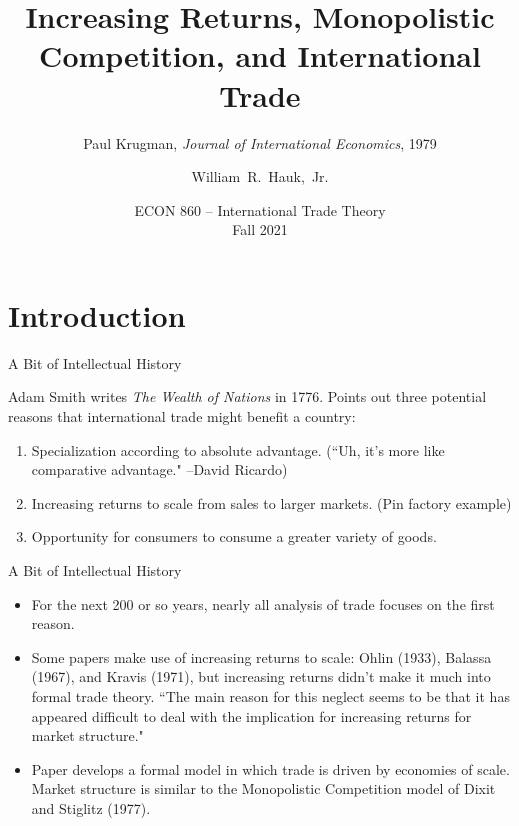 \documentclass[aspectratio=169]{beamer}
\title[Krugman (1979)] %
{Increasing Returns, Monopolistic Competition, and International Trade}
\subtitle{Paul Krugman, \emph{Journal of International Economics}, 1979}
\author [Hauk] %
{William~R.~Hauk,~Jr.} %
\institute[UofSC] %
{
  Darla Moore School of Business\\
  University of South Carolina
}
\date[ECON 860, Fall 2021] %
{ECON 860 -- International Trade Theory\\Fall 2021}
\begin{document}
\frame{\titlepage}


\section{Introduction}


\begin{frame}{A Bit of Intellectual History}

Adam Smith writes \emph{The Wealth of Nations} in 1776.  Points out three potential reasons that international trade might benefit a country:

\begin{enumerate}
    \item<1-> Specialization according to absolute advantage.  (``Uh, it’s more like comparative advantage." –David Ricardo)
    \item<2-> Increasing returns to scale from sales to larger markets.  (Pin factory example)
    \item<3-> Opportunity for consumers to consume a greater variety of goods.
\end{enumerate}
    
\end{frame}


\begin{frame}{A Bit of Intellectual History}

\begin{itemize}
    \item<1-> For the next 200 or so years, nearly all analysis of trade focuses on the first reason.
    \item<2-> Some papers make use of increasing returns to scale: Ohlin (1933), Balassa (1967), and Kravis (1971), but increasing returns didn’t make it much into formal trade theory.  ``The main reason for this neglect seems to be that it has appeared difficult to deal with the implication for increasing returns for market structure."
    \item<3-> Paper develops a formal model in which trade is driven by economies of scale.  Market structure is similar to the Monopolistic Competition model of Dixit and Stiglitz (1977).
\end{itemize}
    
\end{frame}
\end{document}

